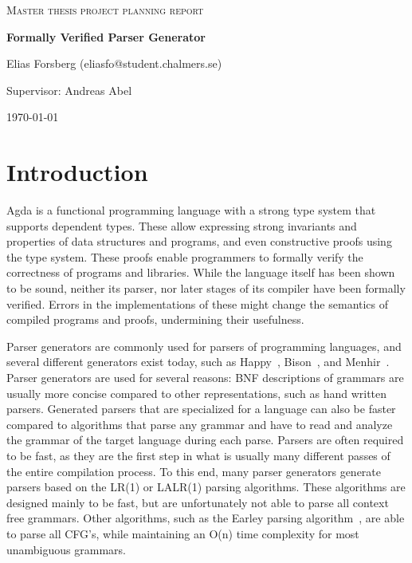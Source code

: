 \documentclass{article}
\begin{document}
\begin{titlepage}
  

\centering
  
  
{\scshape\LARGE Master thesis project planning report\\}
  
\vspace{0.5cm}
  
{\huge\bfseries Formally Verified Parser Generator\\}
  
\vspace{2cm}
  
{\Large Elias Forsberg (eliasfo@student.chalmers.se)\\}
  
\vspace{1.0cm}
  
{\large Supervisor: Andreas Abel\\}
  
\vfill
  
{\large \today\\} 

\end{titlepage}

\section{Introduction}

	Agda is a functional programming language with a strong type system that
	supports dependent types. These allow expressing strong invariants and
	properties of data structures and programs, and even constructive proofs
	using the type system. These proofs enable programmers to formally verify
	the correctness of programs and libraries. While the language itself has
	been shown to be sound, neither its parser, nor later stages of its
	compiler have been formally verified. Errors in the implementations of
	these might change the semantics of compiled programs and proofs,
	undermining their usefulness.

	Parser generators are commonly used for parsers of programming languages,
	and several different generators exist today, such as Happy~\cite{Happy},
	Bison~\cite{Bison}, and Menhir~\cite{Menhir}. Parser generators are used
	for several reasons: BNF descriptions of grammars are usually more concise
	compared to other representations, such as hand written parsers. Generated
	parsers that are specialized for a language can also be faster compared to
	algorithms that parse any grammar and have to read and analyze the grammar
	of the target language during each parse. Parsers are often required to be
	fast, as they are the first step in what is usually many different passes
	of the entire compilation process. To this end, many parser generators
	generate parsers based on the LR(1) or LALR(1) parsing algorithms. These
	algorithms are designed mainly to be fast, but are unfortunately not able
	to parse all context free grammars.  Other algorithms, such as the Earley
	parsing algorithm~\cite{Earley}, are able to parse all CFG's, while
	maintaining an O(n) time complexity for most unambiguous grammars.
\end{document}
